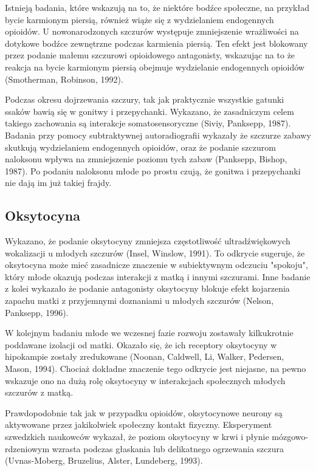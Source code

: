 \documentclass{psychol}
\begin{document}
Istnieją badania, które wskazują na to, że niektóre bodźce społeczne, na przykład bycie karmionym piersią, również wiąże się z wydzielaniem endogennych opioidów. U nowonarodzonych szczurów występuje zmniejszenie wrażliwości na dotykowe bodźce zewnętrzne podczas karmienia piersią. Ten efekt jest blokowany przez podanie małemu szczurowi opioidowego antagonisty, wskazując na to że reakcja na bycie karmionym piersią obejmuje wydzielanie endogennych opioidów (Smotherman, Robinson, 1992).

Podczas okresu dojrzewania szczury, tak jak praktycznie wszystkie gatunki ssaków bawią się w gonitwy i przepychanki. Wykazano, że zasadniczym celem takiego zachowania są interakcje somatosensoryczne (Siviy, Panksepp, 1987). Badania przy pomocy subtraktywnej autoradiografii wykazały że szczurze zabawy skutkują wydzielaniem endogennych opioidów, oraz że podanie szczurom naloksonu wpływa na zmniejszenie poziomu tych zabaw (Panksepp, Bishop, 1987).  Po podaniu naloksonu młode po prostu czują, że gonitwa i przepychanki nie dają im już takiej frajdy.

\subsection{Oksytocyna}

Wykazano, że podanie oksytocyny zmniejsza częstotliwość ultradźwiękowych wokalizacji u młodych szczurów (Insel, Winslow, 1991). To odkrycie sugeruje, że oksytocyna może mieć zasadnicze znaczenie w subiektywnym odczuciu "spokoju", który młode okazują podczas interakcji z matką i innymi szczurami. Inne badanie z kolei wykazało że podanie antagonisty oksytocyny blokuje efekt kojarzenia zapachu matki z przyjemnymi doznaniami u młodych szczurów (Nelson, Panksepp, 1996).

W kolejnym badaniu młode we wczesnej fazie rozwoju zostawały kilkukrotnie poddawane izolacji od matki. Okazało się, że ich receptory oksytocyny w hipokampie zostały zredukowane (Noonan, Caldwell, Li, Walker, Pedersen, Mason, 1994). Chociaż dokładne znaczenie tego odkrycie jest niejasne, na pewno wskazuje ono na dużą rolę oksytocyny w interakcjach społecznych młodych szczurów z matką.

\pagebreak

Prawdopodobnie tak jak w przypadku opioidów, oksytocynowe neurony są aktywowane przez jakikolwiek społeczny kontakt fizyczny. Eksperyment szwedzkich naukowców wykazał, że poziom oksytocyny w krwi i płynie mózgowo-rdzeniowym wzrasta podczas głaskania lub delikatnego ogrzewania szczura (Uvnas-Moberg, Bruzelius, Alster, Lundeberg, 1993).
\end{document}
